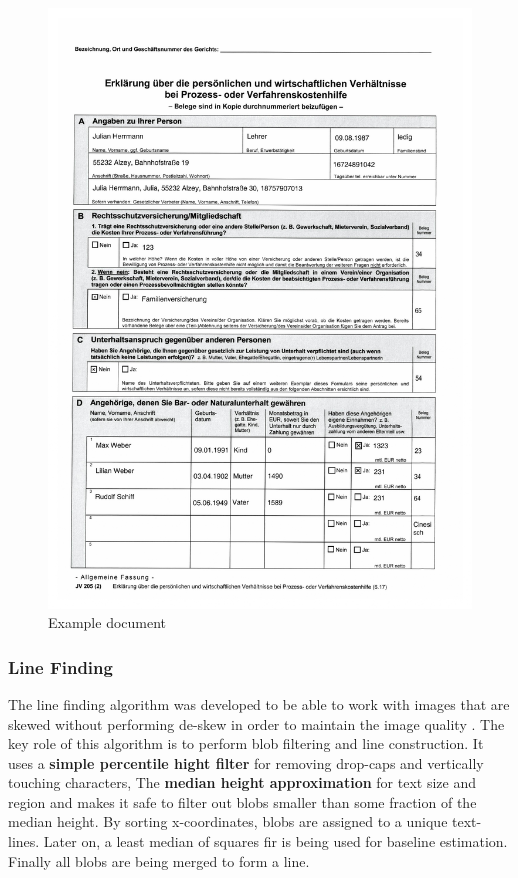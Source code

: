 \begin{figure}[ht]
    \centering
    \includegraphics[width=1\textwidth, trim={0 20cm 0 0},clip]{chapters/images/de_train_0.jpg}
    \caption{Example document}
    \label{fig:exampleimage}
\end{figure}



\subsubsection{Line Finding}

The line finding algorithm was developed to be able to work with images that are skewed without performing de-skew in order to maintain  the image quality \cite{Line_Finding_Algorithem}. The key role of this algorithm is to perform blob filtering and line construction. It uses a \textbf{simple percentile hight filter} for removing drop-caps and vertically touching characters, The \textbf{median height approximation} for text size and region and makes it safe to filter out blobs smaller than some fraction of the median height. By sorting x-coordinates, blobs are assigned to a unique text-lines. Later on, a least median of squares fir \cite{least_median_squares_algorithm} is being used for baseline estimation. Finally all blobs are being merged to form a line.

